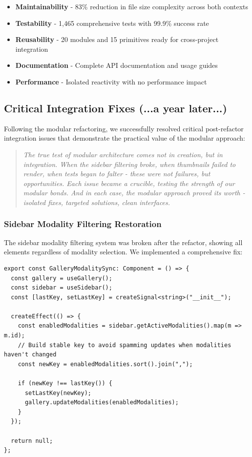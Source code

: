 \documentclass[11pt]{article}
\begin{document}
\begin{itemize}
\item \textbf{Maintainability} - 83\% reduction in file size complexity across both contexts
\item \textbf{Testability} - 1,465 comprehensive tests with 99.9\% success rate
\item \textbf{Reusability} - 20 modules and 15 primitives ready for cross-project integration
\item \textbf{Documentation} - Complete API documentation and usage guides
\item \textbf{Performance} - Isolated reactivity with no performance impact
\end{itemize}

\subsection{Critical Integration Fixes (...a year later...)}

Following the modular refactoring, we successfully resolved critical post-refactor integration issues that demonstrate the practical value of the modular approach:

\begin{quote}
\emph{The true test of modular architecture comes not in creation, but in integration. When the sidebar filtering broke, when thumbnails failed to render, when tests began to falter - these were not failures, but opportunities. Each issue became a crucible, testing the strength of our modular bonds. And in each case, the modular approach proved its worth - isolated fixes, targeted solutions, clean interfaces.}
\end{quote}

\subsubsection{Sidebar Modality Filtering Restoration}

The sidebar modality filtering system was broken after the refactor, showing all elements regardless of modality selection. We implemented a comprehensive fix:

\begin{lstlisting}[style=typescript]
export const GalleryModalitySync: Component = () => {
  const gallery = useGallery();
  const sidebar = useSidebar();
  const [lastKey, setLastKey] = createSignal<string>("__init__");

  createEffect(() => {
    const enabledModalities = sidebar.getActiveModalities().map(m => m.id);
    // Build stable key to avoid spamming updates when modalities haven't changed
    const newKey = enabledModalities.sort().join(",");
    
    if (newKey !== lastKey()) {
      setLastKey(newKey);
      gallery.updateModalities(enabledModalities);
    }
  });

  return null;
};
\end{lstlisting}
\end{document}
